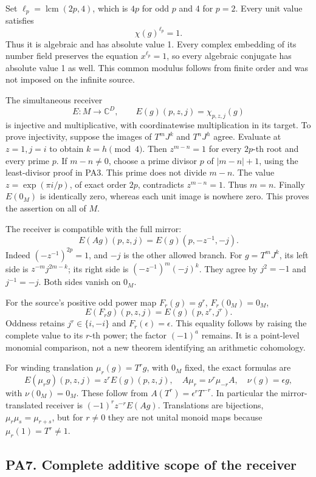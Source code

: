 Set \(\ell_p=\operatorname{lcm}(2p,4)\), which is \(4p\) for odd \(p\) and 4 for \(p=2\). Every unit value satisfies \[
\chi(g)^{\ell_p}=1.
\] Thus it is algebraic and has absolute value 1. Every complex embedding of its number field preserves the equation \(x^{\ell_p}=1\), so every algebraic conjugate has absolute value 1 as well. This common modulus follows from finite order and was not imposed on the infinite source.

The simultaneous receiver \[
E:M\to\mathbb C^D,\qquad E(g)(p,z,j)=\chi_{p,z,j}(g)
\tag{PA6.1}
\] is injective and multiplicative, with coordinatewise multiplication in its target. To prove injectivity, suppose the images of \(T^mJ^k\) and \(T^nJ^h\) agree. Evaluate at \(z=1,j=i\) to obtain \(k=h\pmod4\). Then \(z^{m-n}=1\) for every \(2p\)-th root and every prime \(p\). If \(m-n\ne0\), choose a prime divisor \(p\) of \(|m-n|+1\), using the least-divisor proof in PA3. This prime does not divide \(m-n\). The value \(z=\exp(\pi i/p)\), of exact order \(2p\), contradicts \(z^{m-n}=1\). Thus \(m=n\). Finally \(E(0_M)\) is identically zero, whereas each unit image is nowhere zero. This proves the assertion on all of \(M\).

The receiver is compatible with the full mirror: \[
E(Ag)(p,z,j)=E(g)(p,-z^{-1},-j).
\tag{PA6.2}
\] Indeed \((-z^{-1})^{2p}=1\), and \(-j\) is the other allowed branch. For \(g=T^mJ^k\), its left side is \(z^{-m}j^{2m-k}\); its right side is \((-z^{-1})^m(-j)^k\). They agree by \(j^2=-1\) and \(j^{-1}=-j\). Both sides vanish on \(0_M\).

For the source's positive odd power map \(F_r(g)=g^r\), \(F_r(0_M)=0_M\), \[
E(F_rg)(p,z,j)=E(g)(p,z^r,j^r).
\] Oddness retains \(j^r\in\{i,-i\}\) and \(F_r(\epsilon)=\epsilon\). This equality follows by raising the complete value to its \(r\)-th power; the factor \((-1)^a\) remains. It is a point-level monomial comparison, not a new theorem identifying an arithmetic cohomology.

For winding translation \(\mu_r(g)=T^rg\), with \(0_M\) fixed, the exact formulas are \[
E(\mu_rg)(p,z,j)=z^rE(g)(p,z,j),
\quad A\mu_r=\nu^r\mu_{-r}A,
\quad \nu(g)=\epsilon g,
\] with \(\nu(0_M)=0_M\). These follow from \(A(T^r)=\epsilon^rT^{-r}\). In particular the mirror-translated receiver is \((-1)^rz^{-r}E(Ag)\). Translations are bijections, \(\mu_r\mu_s=\mu_{r+s}\), but for \(r\ne0\) they are not unital monoid maps because \(\mu_r(1)=T^r\ne1\).

\subsection{PA7. Complete additive scope of the receiver}\label{pa20260924-pa7.-complete-additive-scope-of-the-receiver}

